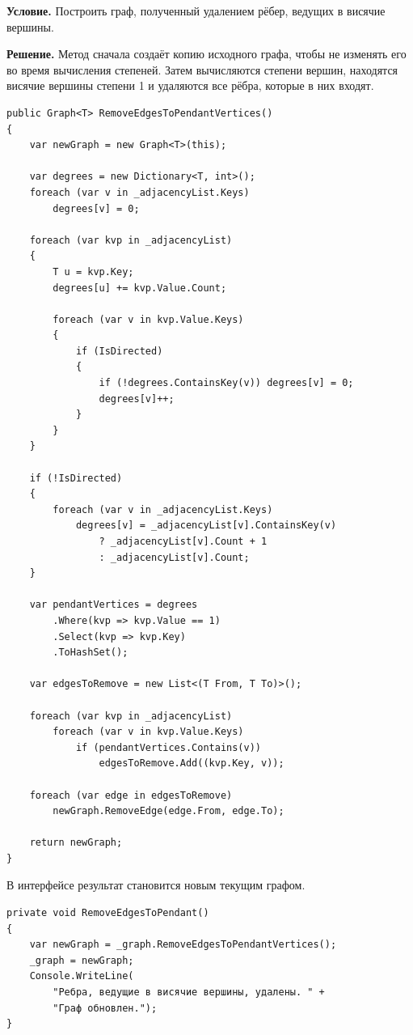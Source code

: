 \documentclass[pract]{SCWorks}
\begin{document}
    \textbf{Условие.}
    Построить граф, полученный удалением рёбер, ведущих в висячие вершины.

    \textbf{Решение.}
    Метод сначала создаёт копию исходного графа, чтобы не изменять его во время вычисления степеней.
    Затем вычисляются степени вершин, находятся висячие вершины степени 1 и удаляются все рёбра, которые в них входят.

    \begin{verbatim}
public Graph<T> RemoveEdgesToPendantVertices()
{
    var newGraph = new Graph<T>(this);

    var degrees = new Dictionary<T, int>();
    foreach (var v in _adjacencyList.Keys)
        degrees[v] = 0;

    foreach (var kvp in _adjacencyList)
    {
        T u = kvp.Key;
        degrees[u] += kvp.Value.Count;

        foreach (var v in kvp.Value.Keys)
        {
            if (IsDirected)
            {
                if (!degrees.ContainsKey(v)) degrees[v] = 0;
                degrees[v]++;
            }
        }
    }

    if (!IsDirected)
    {
        foreach (var v in _adjacencyList.Keys)
            degrees[v] = _adjacencyList[v].ContainsKey(v)
                ? _adjacencyList[v].Count + 1
                : _adjacencyList[v].Count;
    }

    var pendantVertices = degrees
        .Where(kvp => kvp.Value == 1)
        .Select(kvp => kvp.Key)
        .ToHashSet();

    var edgesToRemove = new List<(T From, T To)>();

    foreach (var kvp in _adjacencyList)
        foreach (var v in kvp.Value.Keys)
            if (pendantVertices.Contains(v))
                edgesToRemove.Add((kvp.Key, v));

    foreach (var edge in edgesToRemove)
        newGraph.RemoveEdge(edge.From, edge.To);

    return newGraph;
}
    \end{verbatim}

    В интерфейсе результат становится новым текущим графом.

    \begin{verbatim}
private void RemoveEdgesToPendant()
{
    var newGraph = _graph.RemoveEdgesToPendantVertices();
    _graph = newGraph;
    Console.WriteLine(
        "Ребра, ведущие в висячие вершины, удалены. " +
        "Граф обновлен.");
}
    \end{verbatim}
\end{document}
